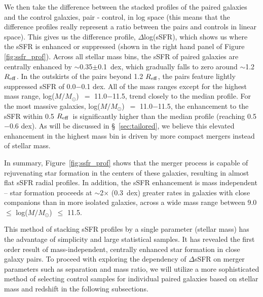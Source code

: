\documentclass[iop,revtex4,twocolumn,apj,numberedappendix,appendixfloats]{emulateapj}
\newcommand{\reff}{$R_{\rm eff}$}
\newcommand{\logm}{log($M/M_{\odot}$)}
\begin{document}
We then take the difference between the stacked profiles of the paired galaxies and the control galaxies, pair - control, in log space (this means that the difference profiles really represent a ratio between the pairs and controls in linear space). This gives us the difference profile, $\Delta$log(sSFR), which shows us where the sSFR is enhanced or suppressed (shown in the right hand panel of Figure \ref{fig:ssfr_prof}). Across all stellar mass bins, the sSFR of paired galaxies are centrally enhanced by $\sim$0.35$\pm$0.1~dex, which gradually falls to zero around $\sim$1.2 \reff. In the outskirts of the pairs beyond 1.2 \reff, the pairs feature lightly suppressed sSFR of 0.0$-$0.1 dex. All of the mass ranges except for the highest mass range, \logm\ $=$ 11.0$-$11.5, trend closely to the median profile. For the most massive galaxies, \logm\ $=$ 11.0$-$11.5, the enhancement to the sSFR within 0.5 \reff\ is significantly higher than the median profile (reaching 0.5$-$0.6 dex). As will be discussed in \S~\ref{sec:tailored}, we believe this elevated enhancement in the highest mass bin is driven by more compact mergers instead of stellar mass. 

In summary, Figure~\ref{fig:ssfr_prof} shows that the merger process is capable of rejuvenating star formation in the centers of these galaxies, resulting in almost flat sSFR radial profiles. In addition, the sSFR enhancement is mass independent -- star formation proceeds at $\sim$2$\times$ (0.3~dex) greater rates in galaxies with close companions than in more isolated galaxies, across a wide mass range between 9.0 $\leq$ \logm\ $\leq$ 11.5.

This method of stacking sSFR profiles by a single parameter (stellar mass) has the advantage of simplicity and large statistical samples. It has revealed the first order result of mass-independent, centrally enhanced star formation in close galaxy pairs. To proceed with exploring the dependency of $\Delta$sSFR on merger parameters such as separation and mass ratio, we will utilize a more sophisticated method of selecting control samples for individual paired galaxies based on stellar mass and redshift in the following subsections.  
\end{document}
